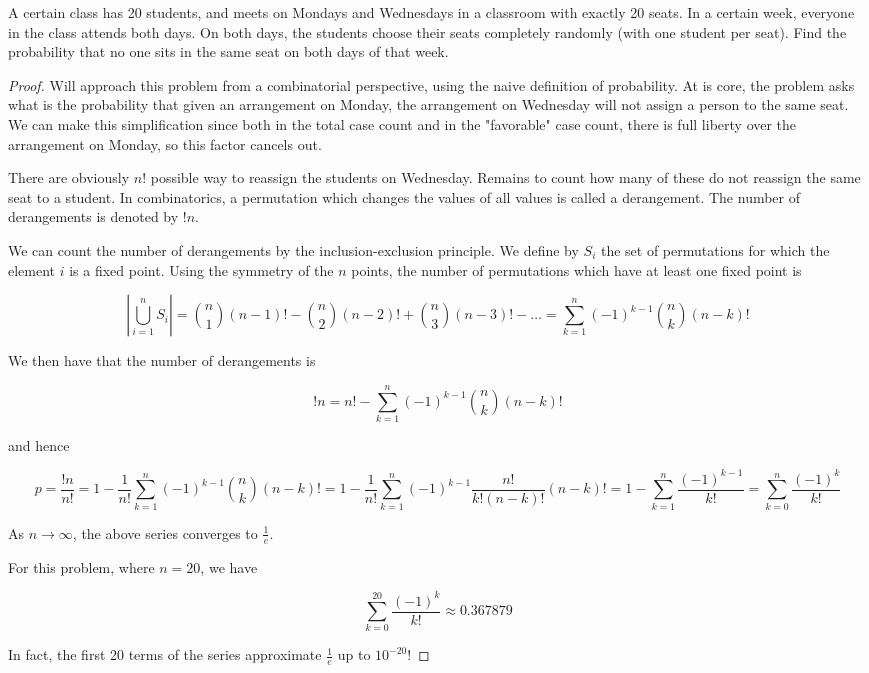 \begin{exercise}{52}
A certain class has 20 students, and meets on Mondays and Wednesdays in a classroom with exactly 20 seats. In a certain week, everyone in the class attends both days. On both days, the students choose their seats completely randomly (with one student per seat). Find the probability that no one sits in the same seat on both days of that week.
\end{exercise}

\begin{proof}
    Will approach this problem from a combinatorial perspective, using the naive definition of probability. At is core, the problem asks what is the probability that given an arrangement on Monday, the arrangement on Wednesday will not assign a person to the same seat. We can make this simplification since both in the total case count and in the "favorable" case count, there is full liberty over the arrangement on Monday, so this factor cancels out.

    There are obviously $n!$ possible way to reassign the students on Wednesday. Remains to count how many of these do not reassign the same seat to a student. In combinatorics, a permutation which changes the values of all values is called a derangement. The number of derangements is denoted by $!n$.

    We can count the number of derangements by the inclusion-exclusion principle. We define by $S_i$ the set of permutations for which the element $i$ is a fixed point. Using the symmetry of the $n$ points, the number of permutations which have at least one fixed point is

    $$|\bigcup_{i=1}^n S_i| = {n \choose 1} (n-1)! - {n \choose 2} (n-2)! + {n \choose 3} (n-3)! - \dots = \sum_{k=1}^n (-1)^{k-1} {n \choose k}(n-k)!$$

    We then have that the number of derangements is

    $$!n = n! - \sum_{k=1}^n (-1)^{k-1} {n \choose k}(n-k)!$$

    and hence

    $$p = \frac{!n}{n!} = 1 - \frac{1}{n!}  \sum_{k=1}^n (-1)^{k-1} {n \choose k}(n-k)! = 1 - \frac{1}{n!}  \sum_{k=1}^n (-1)^{k-1} \frac{n!}{k!(n-k)!}(n-k)! = 1 - \sum_{k=1}^n \frac{(-1)^{k-1} }{k!} =  \sum_{k=0}^n \frac{(-1)^k}{k!} $$

    As $n \rightarrow \infty$, the above series converges to $\frac{1}{e}$.

    For this problem, where $n=20$, we have

    $$\sum_{k=0}^{20}\frac{(-1)^k}{k!} \approx 0.367879$$

    In fact, the first 20 terms of the series approximate $\frac{1}{e}$ up to $10^{-20}$!
    
\end{proof}

